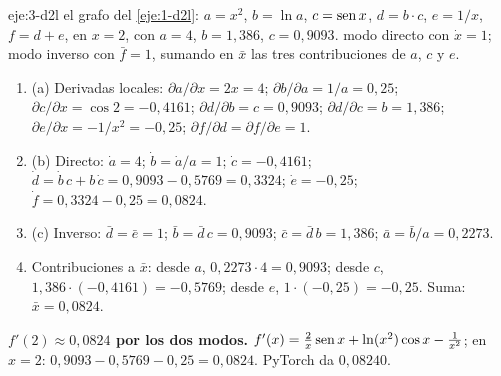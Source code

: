 \begin{solucion}{eje:3-d2l}
\datos el grafo del \cref{eje:1-d2l}: $a=x^{2}$, $b=\ln a$, $c=\operatorname{sen} x$, $d=b\cdot c$, $e=1/x$, $f=d+e$, en $x=2$, con $a=4$, $b=1{,}386$, $c=0{,}9093$.
\planteamiento modo directo con $\dot x=1$; modo inverso con $\bar f=1$, sumando en $\bar x$ las tres contribuciones de $a$, $c$ y $e$.
\pasos
\begin{enumerate}[label=\arabic*.]
  \item (a) Derivadas locales: $\partial a/\partial x=2x=4$; $\partial b/\partial a=1/a=0{,}25$; $\partial c/\partial x=\cos 2=-0{,}4161$; $\partial d/\partial b=c=0{,}9093$; $\partial d/\partial c=b=1{,}386$; $\partial e/\partial x=-1/x^{2}=-0{,}25$; $\partial f/\partial d=\partial f/\partial e=1$.
  \item (b) Directo: $\dot a=4$; $\dot b=\dot a/a=1$; $\dot c=-0{,}4161$; $\dot d=\dot b\,c+b\,\dot c=0{,}9093-0{,}5769=0{,}3324$; $\dot e=-0{,}25$; $\dot f=0{,}3324-0{,}25=0{,}0824$.
  \item (c) Inverso: $\bar d=\bar e=1$; $\bar b=\bar d\,c=0{,}9093$; $\bar c=\bar d\,b=1{,}386$; $\bar a=\bar b/a=0{,}2273$.
  \item Contribuciones a $\bar x$: desde $a$, $0{,}2273\cdot 4=0{,}9093$; desde $c$, $1{,}386\cdot(-0{,}4161)=-0{,}5769$; desde $e$, $1\cdot(-0{,}25)=-0{,}25$. Suma: $\bar x=0{,}0824$.
\end{enumerate}
\resultado \textbf{$f'(2)\approx 0{,}0824$ por los dos modos.}
\comprobacion $f'(x)=\frac{2}{x}\operatorname{sen} x+\ln(x^{2})\cos x-\frac{1}{x^{2}}$; en $x=2$: $0{,}9093-0{,}5769-0{,}25=0{,}0824$. PyTorch da $0{,}08240$.
\end{solucion}


